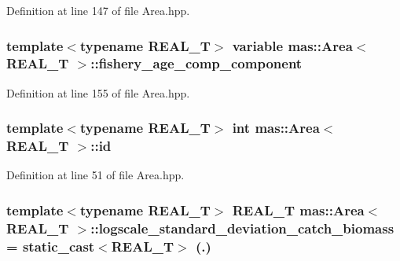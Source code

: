 Definition at line 147 of file Area.\-hpp.

\hypertarget{structmas_1_1_area_a21ab68ae7dd85bcae3c3094f08b5ccb9}{
\subsubsection[{fishery\-\_\-age\-\_\-comp\-\_\-component}]{\setlength{\rightskip}{0pt plus 5cm}template$<$typename R\-E\-A\-L\-\_\-\-T$>$ {\bf variable} {\bf mas\-::\-Area}$<$ R\-E\-A\-L\-\_\-\-T $>$\-::fishery\-\_\-age\-\_\-comp\-\_\-component}}\label{structmas_1_1_area_a21ab68ae7dd85bcae3c3094f08b5ccb9}


Definition at line 155 of file Area.\-hpp.

\hypertarget{structmas_1_1_area_a43732f02d867125feb9ae56e96114619}{
\subsubsection[{id}]{\setlength{\rightskip}{0pt plus 5cm}template$<$typename R\-E\-A\-L\-\_\-\-T$>$ int {\bf mas\-::\-Area}$<$ R\-E\-A\-L\-\_\-\-T $>$\-::id}}\label{structmas_1_1_area_a43732f02d867125feb9ae56e96114619}


Definition at line 51 of file Area.\-hpp.

\hypertarget{structmas_1_1_area_a5cb89e458c67e5fcaa967a8c268f2249}{
\subsubsection[{logscale\-\_\-standard\-\_\-deviation\-\_\-catch\-\_\-biomass}]{\setlength{\rightskip}{0pt plus 5cm}template$<$typename R\-E\-A\-L\-\_\-\-T$>$ R\-E\-A\-L\-\_\-\-T {\bf mas\-::\-Area}$<$ R\-E\-A\-L\-\_\-\-T $>$\-::logscale\-\_\-standard\-\_\-deviation\-\_\-catch\-\_\-biomass = static\-\_\-cast$<$R\-E\-A\-L\-\_\-\-T$>$ (.)}}\label{structmas_1_1_area_a5cb89e458c67e5fcaa967a8c268f2249}



